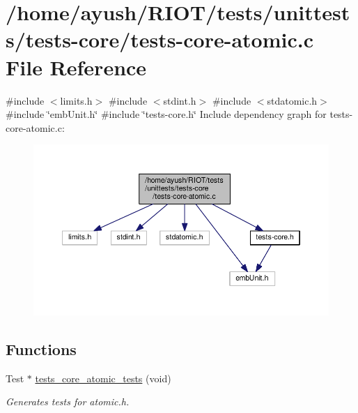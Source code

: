 \hypertarget{tests-core-atomic_8c}{}\section{/home/ayush/\+R\+I\+O\+T/tests/unittests/tests-\/core/tests-\/core-\/atomic.c File Reference}
\label{tests-core-atomic_8c}
{\ttfamily \#include $<$limits.\+h$>$}\newline
{\ttfamily \#include $<$stdint.\+h$>$}\newline
{\ttfamily \#include $<$stdatomic.\+h$>$}\newline
{\ttfamily \#include \char`\"{}emb\+Unit.\+h\char`\"{}}\newline
{\ttfamily \#include \char`\"{}tests-\/core.\+h\char`\"{}}\newline
Include dependency graph for tests-\/core-\/atomic.c\+:
\nopagebreak
\begin{figure}[H]
\begin{center}
\leavevmode
\includegraphics[width=350pt]{tests-core-atomic_8c__incl}
\end{center}
\end{figure}
\subsection*{Functions}
\begin{DoxyCompactItemize}
\item 
Test $\ast$ \hyperlink{group__unittests_gadc7f89b561245603549db45a06d93cce}{tests\+\_\+core\+\_\+atomic\+\_\+tests} (void)
\begin{DoxyCompactList}\small\item\em Generates tests for atomic.\+h. \end{DoxyCompactList}\end{DoxyCompactItemize}
